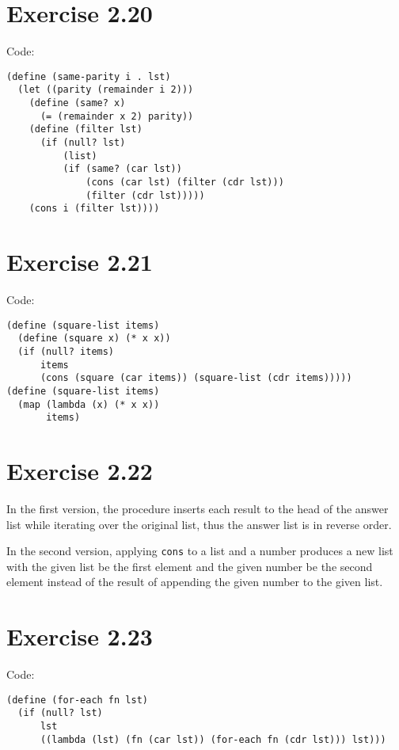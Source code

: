 \documentclass[../main.tex]{subfiles}
\begin{document}
\section{Exercise 2.20}

Code:

\begin{lstlisting}
(define (same-parity i . lst)
  (let ((parity (remainder i 2)))
    (define (same? x)
      (= (remainder x 2) parity))
    (define (filter lst)
      (if (null? lst)
          (list)
          (if (same? (car lst))
              (cons (car lst) (filter (cdr lst)))
              (filter (cdr lst)))))
    (cons i (filter lst))))
\end{lstlisting}

\section{Exercise 2.21}

Code:

\begin{lstlisting}
(define (square-list items)
  (define (square x) (* x x))
  (if (null? items)
      items
      (cons (square (car items)) (square-list (cdr items)))))
(define (square-list items)
  (map (lambda (x) (* x x))
       items)
\end{lstlisting}

\section{Exercise 2.22}

In the first version, the procedure inserts
 each result to the head of the answer list
 while iterating over the original list, thus
 the answer list is in reverse order.

In the second version, applying \lstinline{cons}
 to a list and a number produces a new list with
 the given list be the first element and the given
 number be the second element instead of the result
 of appending the given number to the given list.

\section{Exercise 2.23}

Code:

\begin{lstlisting}
(define (for-each fn lst)
  (if (null? lst)
      lst
      ((lambda (lst) (fn (car lst)) (for-each fn (cdr lst))) lst)))
\end{lstlisting}
\end{document}
